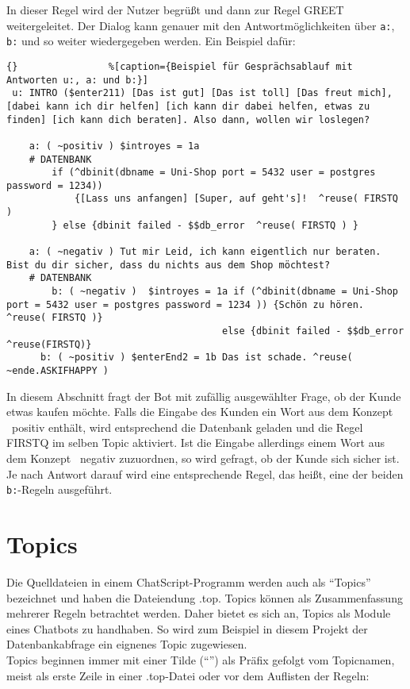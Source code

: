 In dieser Regel wird der Nutzer begrüßt und dann zur Regel GREET weitergeleitet.
Der Dialog kann genauer mit den Antwortmöglichkeiten über \lstinline|a:|, \lstinline|b:| und so weiter wiedergegeben werden. Ein Beispiel dafür:

\begin{lstlisting}{}				%[caption={Beispiel für Gesprächsablauf mit Antworten u:, a: und b:}]
 u: INTRO ($enter211) [Das ist gut] [Das ist toll] [Das freut mich], [dabei kann ich dir helfen] [ich kann dir dabei helfen, etwas zu finden] [ich kann dich beraten]. Also dann, wollen wir loslegen?

	a: ( ~positiv ) $introyes = 1a
	# DATENBANK
	    if (^dbinit(dbname = Uni-Shop port = 5432 user = postgres password = 1234))
	        {[Lass uns anfangen] [Super, auf geht's]!  ^reuse( FIRSTQ )
	    } else {dbinit failed - $$db_error  ^reuse( FIRSTQ ) }
			
	a: ( ~negativ ) Tut mir Leid, ich kann eigentlich nur beraten. Bist du dir sicher, dass du nichts aus dem Shop möchtest?
	# DATENBANK
		b: ( ~negativ )  $introyes = 1a if (^dbinit(dbname = Uni-Shop port = 5432 user = postgres password = 1234 )) {Schön zu hören. ^reuse( FIRSTQ )}
                                      else {dbinit failed - $$db_error ^reuse(FIRSTQ)}
	  b: ( ~positiv ) $enterEnd2 = 1b Das ist schade. ^reuse( ~ende.ASKIFHAPPY )
\end{lstlisting}

In diesem Abschnitt fragt der Bot mit zufällig ausgewählter Frage, ob der Kunde etwas kaufen möchte. Falls die Eingabe des Kunden ein Wort aus dem Konzept ~positiv enthält, wird entsprechend die Datenbank geladen und die Regel FIRSTQ im selben Topic aktiviert. Ist die Eingabe allerdings einem Wort aus dem Konzept ~negativ zuzuordnen, so wird gefragt, ob der Kunde sich sicher ist. Je nach Antwort darauf wird eine entsprechende Regel, das heißt, eine der beiden \lstinline|b:|-Regeln ausgeführt.\\ 


\section{Topics}
\label{sec:ChatScript: Topics}

Die Quelldateien in einem ChatScript-Programm werden auch als "`Topics"' bezeichnet und haben die Dateiendung .top. Topics können als Zusammenfassung mehrerer Regeln betrachtet werden. Daher bietet es sich an, Topics als Module eines Chatbots zu handhaben. So wird zum Beispiel in diesem Projekt der Datenbankabfrage ein eignenes Topic zugewiesen.\\
Topics beginnen immer mit einer Tilde ("`\texttildelow "') als Präfix gefolgt vom Topicnamen, meist als erste Zeile in einer .top-Datei oder vor dem Auflisten der Regeln:

